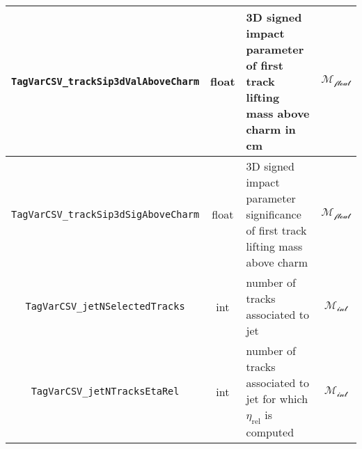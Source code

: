 \begin{table}[ht]
\begin{tabularx}{\textwidth}{|c|c|X|c|}
\hline
\texttt{TagVarCSV\_trackSip3dValAboveCharm} & float & 3D signed impact parameter of first track lifting mass above charm in cm & \cellcolor{green!50}$\mathcal{M_{\text{float}}}$ \\
\hline
\texttt{TagVarCSV\_trackSip3dSigAboveCharm} & float & 3D signed impact parameter significance of first track lifting mass above charm & \cellcolor{green!50}$\mathcal{M_{\text{float}}}$ \\
\hline
\texttt{TagVarCSV\_jetNSelectedTracks} & int & number of tracks associated to jet & \cellcolor{orange!50}$\mathcal{M_{\text{int}}}$ \\
\hline
\texttt{TagVarCSV\_jetNTracksEtaRel} & int & number of tracks associated to jet for which \( \eta_{\text{rel}} \) is computed & \cellcolor{orange!50}$\mathcal{M_{\text{int}}}$ \\
\hline
\end{tabularx}
\label{tab:global_input_features}
\end{table}


